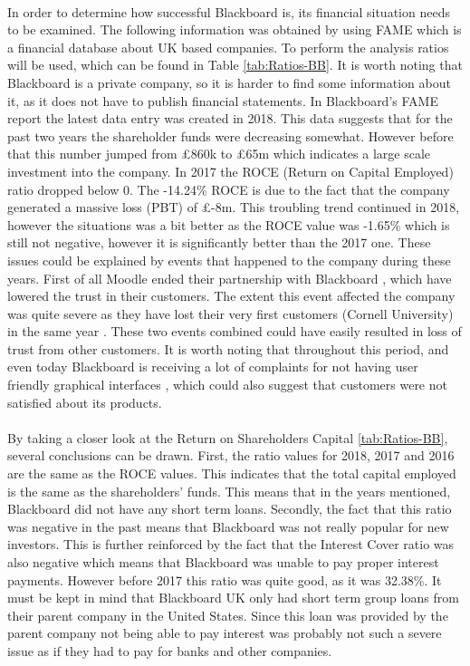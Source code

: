 \documentclass[]{article}
\begin{document}
\paragraph{}
In order to determine how successful Blackboard is, its financial situation needs to be examined. The following information was obtained by using FAME which is a financial database about UK based companies. To perform the analysis ratios will be used, which can be found in Table \ref{tab:Ratios-BB}. It is worth noting that Blackboard is a private company, so it is harder to find some information about it, as it does not have to publish financial statements. In Blackboard's FAME report \cite{FAME-Blackboard} the latest data entry was created in 2018. This data suggests that for the past two years the shareholder funds were decreasing somewhat. However before that this number jumped from £860k to £65m which indicates a large scale investment into the company. In 2017 the ROCE (Return on Capital Employed) ratio dropped below 0. The -14.24\% ROCE is due to the fact that the company generated a massive loss (PBT) of £-8m. This troubling trend continued in 2018, however the situations was a bit better as the ROCE value was -1.65\% which is still not negative, however it is significantly better than the 2017 one. These issues could be explained by events that happened to the company during these years. First of all Moodle ended their partnership with Blackboard \cite{Moodle-breaks-up-with-Blackboard}, which have lowered the trust in their customers. The extent this event affected the company was quite severe as they have lost their very first customers (Cornell University) in the same year \cite{Cornell-leaves-BB}. These two events combined could have easily resulted in loss of trust from other customers. It is worth noting that throughout this period, and even today Blackboard is receiving a lot of complaints for not having user friendly graphical interfaces \cite{BB-Reviews}, which could also suggest that customers were not satisfied about its products.

\paragraph{}
By taking a closer look at the Return on Shareholders Capital \ref{tab:Ratios-BB}, several conclusions can be drawn. First, the ratio values for 2018, 2017 and 2016 are the same as the ROCE values. This indicates that the total capital employed is the same as the shareholders' funds. This means that in the years mentioned, Blackboard did not have any short term loans. Secondly, the fact that this ratio was negative in the past means that Blackboard was not really popular for new investors. This is further reinforced by the fact that the Interest Cover ratio was also negative which means that Blackboard was unable to pay proper interest payments. However before 2017 this ratio was quite good, as it was 32.38\%. It must be kept in mind that Blackboard UK only had short term group loans from their parent company in the United States. Since this loan was provided by the parent company not being able to pay interest was probably not such a severe issue as if they had to pay for banks and other companies.
\end{document}
